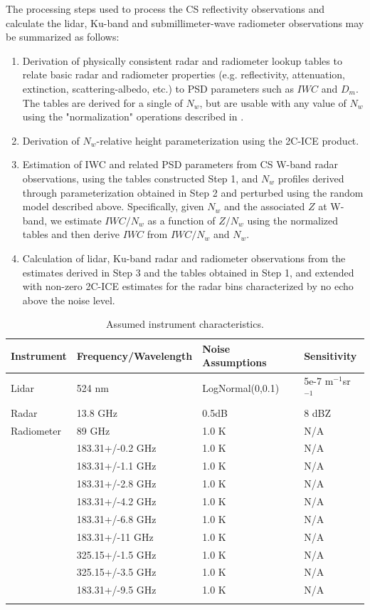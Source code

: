 \documentclass{ametsocV6.1}
\begin{document}
The processing steps used to process the CS reflectivity observations and calculate the lidar, Ku-band and 
submillimeter-wave radiometer observations may be summarized as follows:
\begin{enumerate}
\item Derivation of physically consistent radar and radiometer lookup tables to relate basic radar and 
radiometer properties (e.g. reflectivity, attenuation, extinction, scattering-albedo, etc.) to PSD parameters 
such as $IWC$ and $D_m$. The tables are derived for a single of $N_w$, but are usable with any value of 
$N_w$ using the "normalization" operations described in \citep{grecu2011}.
\item Derivation of $N_w$-relative height parameterization using the 2C-ICE product.
\item Estimation of IWC and related PSD parameters from CS W-band radar observations, using the tables 
constructed Step 1, and $N_w$ profiles derived through parameterization obtained in Step 2 and perturbed using the random model 
described above. Specifically, given $N_w$ and the associated $Z$ at W-band, we estimate $IWC/N_w$ as a function of $Z/N_w$ using the
normalized tables and then derive $IWC$ from $IWC/N_w$ and $N_w$.
\item Calculation of lidar, Ku-band radar and radiometer observations from the estimates derived in Step 3 
and the tables obtained in Step 1, and extended with non-zero 2C-ICE estimates for the radar bins characterized by no echo
above the noise level.
\end{enumerate}

\begin{table}
    \caption{Assumed instrument characteristics.}\label{t_sensors}
    \begin{center}
    \begin{tabular}{llll}

    Instrument & Frequency/Wavelength & Noise Assumptions& Sensitivity \\
    \hline
    Lidar & 524 nm & LogNormal(0,0.1) & 5e-7 m$^{-1}$sr$^{-1}$ \\
    \hline
    Radar & 13.8 GHz & 0.5dB & 8 dBZ \\
    \hline
    Radiometer & 89 GHz & 1.0 K & N/A \\
    & 183.31+/-0.2 GHz & 1.0 K & N/A \\
    & 183.31+/-1.1 GHz & 1.0 K & N/A \\
    & 183.31+/-2.8 GHz & 1.0 K & N/A \\
    & 183.31+/-4.2 GHz & 1.0 K & N/A \\
    & 183.31+/-6.8 GHz & 1.0 K & N/A \\
    & 183.31+/-11 GHz & 1.0 K & N/A \\
    & 325.15+/-1.5 GHz & 1.0 K & N/A \\
    & 325.15+/-3.5 GHz & 1.0 K & N/A \\
    & 183.31+/-9.5 GHz & 1.0 K & N/A \\
   \hline \\
    
    \end{tabular}
\end{center}
\end{table}
\end{document}
